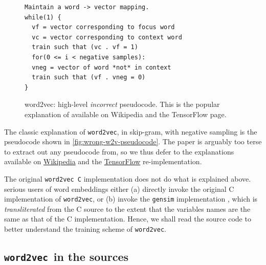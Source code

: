 \documentclass[11pt]{book}
\newcommand{\wtov}{\texttt{word2vec }}
\begin{document}
\begin{figure}[htb]
\begin{verbatim}
Maintain a word -> vector mapping.
while(1) {
  vf = vector corresponding to focus word
  vc = vector corresponding to context word
  train such that (vc . vf = 1)
  for(0 <= i < negative samples):
  vneg = vector of word *not* in context
  train such that (vf . vneg = 0)
}
\end{verbatim}
\caption{word2vec:  high-level \emph{incorrect} pseudocode. This is the popular
    explanation of available on Wikipedia and the TensorFlow page.}
\label{fig:wrong-w2v-pseudocode}
\end{figure}

%

The classic explanation of \texttt{word2vec}, in skip-gram, with negative
sampling is the pseudocode shown in \autoref{fig:wrong-w2v-pseudocode}. The paper
is arguably too terse to extract out any pseudocode from, so we thus defer to the
explanations available on \href{https://en.wikipedia.org/wiki/Word2vec#Training_algorithm}{Wikipedia}
and the \href{https://www.tensorflow.org/tutorials/representation/word2vec}{TensorFlow} re-implementation.

The original \wtov \texttt{C} implementation does not do what is explained above.
serious users of word embeddings either (a) directly invoke the original C
implementation of \texttt{word2vec}, or (b) invoke the \texttt{gensim}
implementation \cite{vrehuuvrek2011gensim}, which is \emph{transliterated} from the C source to the extent
that the variables names are the same as that of the C implementation.
Hence, we shall read the source code to
better understand the training scheme of \texttt{word2vec}.

\subsection{\wtov in the sources}
\end{document}
